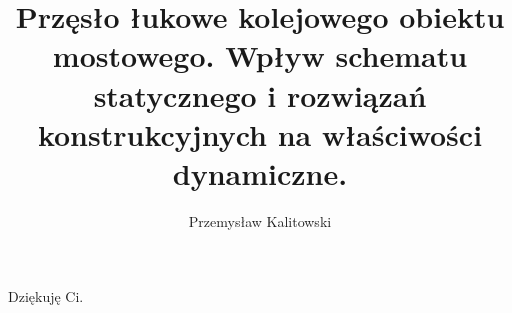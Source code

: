 
\title{Przęsło łukowe kolejowego obiektu mostowego. Wpływ schematu statycznego i rozwiązań konstrukcyjnych na właściwości dynamiczne.}
\author{Przemysław Kalitowski}



\begin{sloppypar}
\frontmatter

\myemptypage



\myemptypage





\thispagestyle{empty}
\vspace*{20cm}
\hfill Dziękuję Ci.
\vfill
\pagebreak[4]


\myemptypage


\tableofcontents
\newpage






\mainmatter




	





	






\printbibliography[heading=bibintoc]
\end{sloppypar}
